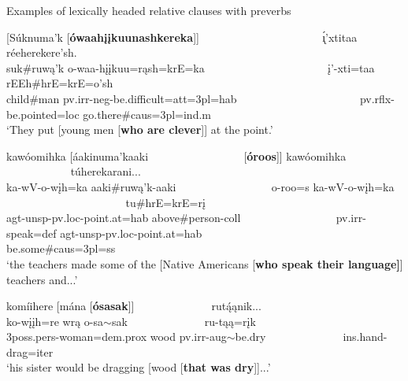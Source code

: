 \begin{exe}
    \item\label{Ch5RCExamples} Examples of lexically headed relative clauses with preverbs

    \begin{xlist}
        \item\label{Ch5RCExamplesA} \glll \textnormal{[}Súknuma'k \textnormal{[}\textbf{ówaahįįkuunashkereka}\textnormal{]]} ~ ~ ~ ~ ~ ~ ~ ~ ~ ~ ~ ~ ~ \'{ı̨}'xtitaa réeherekere'sh.\\
        suk\#ruwą'k o-waa-hįįkuu=rąsh=krE=ka ~ ~ ~ ~ ~ ~ ~ ~ ~ ~ ~ ~ ~ į'-xti=taa rEEh\#hrE=krE=o'sh\\
        \textnormal{child}\#\textnormal{man} pv.irr-neg-\textnormal{be.difficult}=att=3pl=hab ~ ~ ~ ~ ~ ~ ~ ~ ~ ~ ~ ~ ~ pv.rflx-\textnormal{be.pointed}=loc \textnormal{go.there}\#caus=3pl=ind.m\\
        \glt `They put [young men [\textbf{who are clever}]] at the point.' \citep[210]{hollow1973b}

        \item\label{Ch5RCExamplesB} \glll kawóomihka \textnormal{[}áakinuma'kaaki ~ ~ ~ ~ ~ ~ ~ ~ ~ ~ \textnormal{[}\textbf{óroos}\textnormal{]]} kawóomihka ~ ~ ~ ~ ~ ~ ~ ~ ~ ~ ~ ~ ~ túherekarani...\\
        ka-wV-o-wįh=ka aaki\#ruwą'k-aaki ~ ~ ~ ~ ~ ~ ~ ~ ~ ~ o-roo=s ka-wV-o-wįh=ka ~ ~ ~ ~ ~ ~ ~ ~ ~ ~ ~ ~ ~ tu\#hrE=krE=rį\\
        agt-unsp-pv.loc-\textnormal{point.at}=hab \textnormal{above}\#\textnormal{person}-coll ~ ~ ~ ~ ~ ~ ~ ~ ~ ~ pv.irr-\textnormal{speak}=def agt-unsp-pv.loc-\textnormal{point.at}=hab ~ ~ ~ ~ ~ ~ ~ ~ ~ ~ ~ ~ ~  \textnormal{be.some}\#caus=3pl=ss\\
        \glt `the teachers made some of the [Native Americans [\textbf{who speak their language]}] teachers and...' \citep[236]{trechter2012b}

        \item\label{Ch5RCExamplesC} \glll komíihere \textnormal{[}mána \textnormal{[}\textbf{ósasak}\textnormal{]]} ~ ~ ~ ~ ~ ~ ~ ~ rutą́ąnik...\\
        ko-wįįh=re wrą o-sa$\sim$sak ~ ~ ~ ~ ~ ~ ~ ~ ru-tąą=rįk\\
        3poss.pers-\textnormal{woman}=dem.prox \textnormal{wood} pv.irr-aug$\sim$\textnormal{be.dry} ~ ~ ~ ~ ~ ~ ~ ~ ins.hand-\textnormal{drag}=iter\\
        \glt `his sister would be dragging [wood [\textbf{that was dry}]]...'


\end{xlist}
\end{exe}
